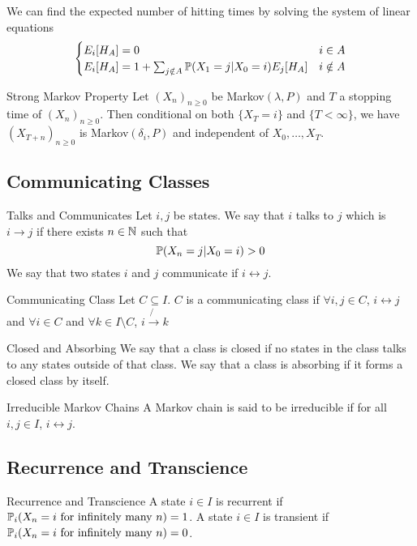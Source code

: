 \documentclass[a4paper]{article}
\begin{document}
\begin{prp}{}{} We can find the expected number of hitting times by solving the system of linear equations $$\begin{cases}
E_i[H_A]=0 & i\in A\\
E_i[H_A]=1+\sum_{j\notin A}\mathbb{P}(X_1=j|X_0=i)E_j[H_A] & i\notin A
\end{cases}$$
\end{prp}

\begin{thm}{Strong Markov Property}{} Let $(X_n)_{n\geq 0}$ be Markov$(\lambda,P)$ and $T$ a stopping time of $(X_n)_{n\geq 0}$. Then conditional on both $\{X_T=i\}$ and $\{T<\infty\}$, we have $(X_{T+n})_{n\geq 0}$ is Markov$(\delta_i,P)$ and independent of $X_0,\dots,X_T$. 
\end{thm}

\subsection{Communicating Classes}
\begin{defn}{Talks and Communicates}{} Let $i,j$ be states. We say that $i$ talks to $j$ which is $i\rightarrow j$ if there exists $n\in\mathbb{N}$ such that $$\mathbb{P}(X_n=j|X_0=i)>0$$ We say that two states $i$ and $j$ communicate if $i\leftrightarrow j$. 
\end{defn}

\begin{defn}{Communicating Class}{} Let $C\subseteq I$. $C$ is a communicating class if $\forall i,j\in C$, $i\leftrightarrow j$ and $\forall i\in C$ and $\forall k\in I\setminus C$, $i\not{\rightarrow} k$ 
\end{defn}

\begin{defn}{Closed and Absorbing}{} We say that a class is closed if no states in the class talks to any states outside of that class. We say that a class is absorbing if it forms a closed class by itself. 
\end{defn}

\begin{defn}{Irreducible Markov Chains}{} A Markov chain is said to be irreducible if for all $i,j\in I$, $i\leftrightarrow j$. 
\end{defn}

\subsection{Recurrence and Transcience}
\begin{defn}{Recurrence and Transcience}{} A state $i\in I$ is recurrent if $\mathbb{P}_i(X_n=i\text{ for infinitely many }n)=1$. A state $i\in I$ is transient if $\mathbb{P}_i(X_n=i\text{ for infinitely many }n)=0$. 
\end{defn}
\end{document}
